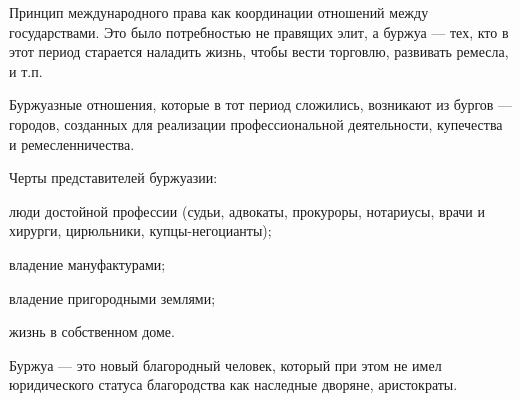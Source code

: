 

Принцип международного права как координации отношений
между государствами. Это было потребностью не правящих элит, а буржуа --- тех, кто в этот период старается наладить жизнь, чтобы вести торговлю, развивать ремесла, и т.п. 

Буржуазные отношения, которые в тот период сложились, возникают из
бургов --- городов, созданных для реализации профессиональной деятельности, купечества и ремесленничества. 

Черты представителей буржуазии:

люди достойной профессии (судьи, адвокаты, прокуроры, нотариусы, врачи и хирурги,
цирюльники, купцы-негоцианты);

владение мануфактурами;

владение пригородными землями;

жизнь в собственном доме.

Буржуа --- это новый благородный человек, который при этом не имел юридического статуса благородства как наследные дворяне, аристократы. 




